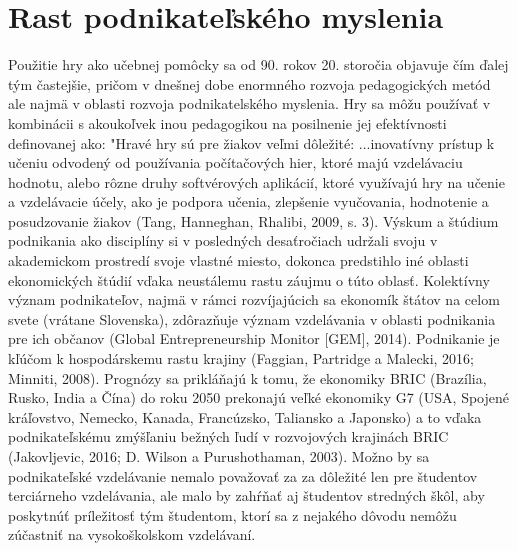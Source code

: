 \documentclass[10pt,oneside,slovak,a4paper]{article}
\begin{document}
\section{Rast podnikateľského myslenia}

Použitie hry ako učebnej pomôcky sa od 90. rokov 20. storočia objavuje čím ďalej tým častejšie, pričom v dnešnej dobe enormného rozvoja pedagogických metód ale najmä v oblasti rozvoja podnikatelského myslenia.
Hry sa môžu používať v kombinácii s akoukoľvek inou pedagogikou na posilnenie jej 
efektívnosti definovanej ako: "Hravé hry sú pre žiakov veľmi dôležité:
...inovatívny prístup k učeniu odvodený od používania počítačových hier, ktoré majú 
vzdelávaciu hodnotu, alebo rôzne druhy softvérových aplikácií, ktoré využívajú hry na učenie a 
vzdelávacie účely, ako je podpora učenia, zlepšenie vyučovania, hodnotenie a posudzovanie žiakov (Tang, Hanneghan, Rhalibi, 2009, s. 3).
Výskum a štúdium podnikania ako disciplíny si v posledných desaťročiach udržali svoju 
v akademickom prostredí svoje vlastné miesto, dokonca predstihlo iné oblasti ekonomických štúdií vďaka neustálemu rastu 
záujmu o túto oblasť. Kolektívny význam podnikateľov, najmä v rámci rozvíjajúcich sa 
ekonomík štátov na celom svete (vrátane Slovenska), zdôrazňuje význam vzdelávania v oblasti podnikania pre ich občanov (Global Entrepreneurship Monitor [GEM], 2014). Podnikanie je kľúčom k hospodárskemu rastu krajiny (Faggian, Partridge a Malecki, 2016; Minniti, 
2008). Prognózy sa prikláňajú k tomu, že ekonomiky BRIC (Brazília, Rusko, India a Čína) do roku 2050 prekonajú veľké ekonomiky G7 (USA, Spojené kráľovstvo, Nemecko, Kanada, Francúzsko, Taliansko a Japonsko) 
a to vďaka podnikateľskému zmýšľaniu bežných ľudí v rozvojových krajinách BRIC (Jakovljevic, 2016; 
D. Wilson a Purushothaman, 2003). Možno by sa podnikateľské vzdelávanie nemalo považovať za 
za dôležité len pre študentov terciárneho vzdelávania, ale malo by zahŕňať aj študentov stredných škôl, aby 
poskytnúť príležitosť tým študentom, ktorí sa z nejakého dôvodu nemôžu zúčastniť na vysokoškolskom vzdelávaní.
\end{document}

